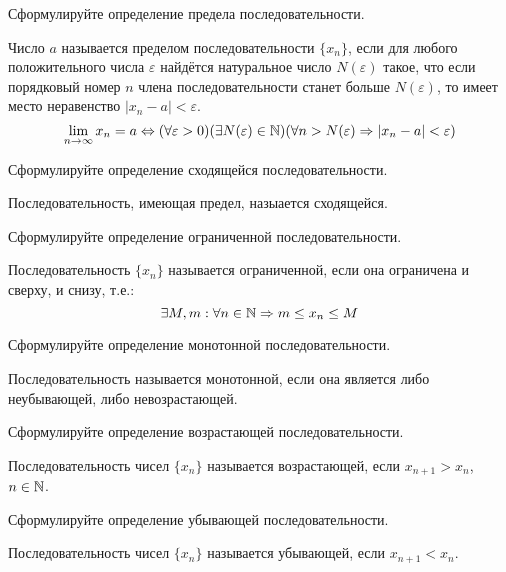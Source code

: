 \begin{question}
  Сформулируйте определение предела последовательности.
\end{question}
\begin{answer}
 Число $a$ называется пределом последовательности $\{x_{n}\}$, если для любого положительного числа $\varepsilon$ найдётся натуральное число $N(\varepsilon)$ такое, что если порядковый номер $n$ члена последовательности станет больше $N(\varepsilon)$, то имеет место неравенство $|x_{n} - a| < \varepsilon$.\[
 \lim_{n \to \infty} x_{n} = a \iff (\forall \varepsilon > 0)(\exists N(\varepsilon) \in \N)(\forall  n > N(\varepsilon) \implies |x_{n} - a| < \varepsilon) 
 \] 
\end{answer}

\begin{question}
  Сформулируйте определение сходящейся последовательности.
\end{question}
\begin{answer}
  Последовательность, имеющая предел, назыается сходящейся.
\end{answer}

\begin{question}
  Сформулируйте определение ограниченной последовательности.
\end{question}
\begin{answer}
  Последовательность $\{x_{n}\}$ называется ограниченной, если она ограничена и сверху, и снизу, т.е.: \[
  \exists M, m : \forall n \in \mathbb{N} \Rightarrow m \le x_{n} \le M
  \] 
\end{answer}

\begin{question}
  Сформулируйте определение монотонной последовательности.
\end{question}
\begin{answer}
  Последовательность называется монотонной, если она является либо неубывающей, либо невозрастающей.
\end{answer}

\begin{question}
  Сформулируйте определение возрастающей последовательности.
\end{question}
\begin{answer}
  Последовательность чисел $\{x_n\}$ называется возрастающей, если $x_{n+1} > x_{n}$, $n \in \mathbb{N}$.
\end{answer}

\begin{question}
  Сформулируйте определение убывающей последовательности.
\end{question}
\begin{answer}
  Последовательность чисел $\{x_{n}\}$ называется убывающей, если $x_{n+1} < x_{n}$.
\end{answer}

